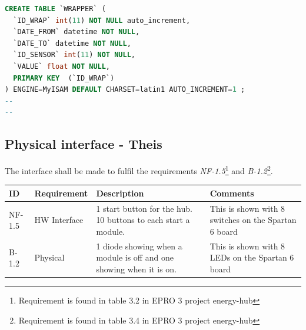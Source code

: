 \begin{lstlisting}[language=sql, stepnumber=0, tabsize=1]
CREATE TABLE `WRAPPER` (
  `ID_WRAP` int(11) NOT NULL auto_increment,
  `DATE_FROM` datetime NOT NULL,
  `DATE_TO` datetime NOT NULL,
  `ID_SENSOR` int(11) NOT NULL,
  `VALUE` float NOT NULL,
  PRIMARY KEY  (`ID_WRAP`)
) ENGINE=MyISAM DEFAULT CHARSET=latin1 AUTO_INCREMENT=1 ;
--
--
		\end{lstlisting}	


\subsection{Physical interface - Theis}
The interface shall be made to fulfil the requirements \textit{NF-1.5}\footnote{Requirement is found in table 3.2 in EPRO 3 project energy-hub} and \textit{B-1.2}\footnote{Requirement is found in table 3.4 in EPRO 3 project energy-hub}.\\
\begin{table}[H]
\centering
	\begin{tabular}{|p{1.2cm}|p{2.3cm}|p{6cm}|p{6cm}|}
	\hline
	ID		& Requirement	& Description															& Comments\\\hline
	NF-1.5	& HW Interface	& 1 start button for the hub. 10 buttons to each start a module.		& This is shown with 8 switches on the Spartan 6 board\\\hline
	B-1.2	& Physical		& 1 diode showing when a module is off and one showing when it is on.	& This is shown with 8 LEDs on the Spartan 6 board\\\hline
	\end{tabular}
\end{table}

